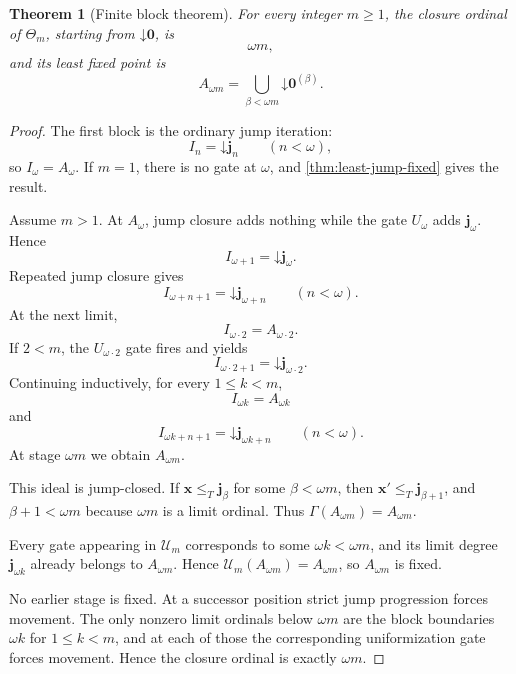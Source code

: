 \documentclass[10pt,a4paper]{amsart}
\newtheorem{theorem}{Theorem}
\newcommand{\down}{\mathord{\downarrow}}
\newcommand{\leT}{\leq_T}
\begin{document}
\begin{theorem}[Finite block theorem]
\label{thm:finite-block}
For every integer $m\geq1$, the closure ordinal of $\Theta_m$, starting from $\down\mathbf0$, is
\[
\omega m,
\]
and its least fixed point is
\begin{equation}
A_{\omega m}
=
\bigcup_{\beta<\omega m}\down\mathbf0^{(\beta)}.
\label{eq:A-omegam}
\end{equation}
\end{theorem}

\begin{proof}
The first block is the ordinary jump iteration:
\[
I_n=\down\mathbf j_n
\qquad(n<\omega),
\]
so $I_\omega=A_\omega$. If $m=1$, there is no gate at $\omega$, and \cref{thm:least-jump-fixed} gives the result.

Assume $m>1$. At $A_\omega$, jump closure adds nothing while the gate $U_\omega$ adds $\mathbf j_\omega$. Hence
\[
I_{\omega+1}=\down\mathbf j_\omega.
\]
Repeated jump closure gives
\[
I_{\omega+n+1}=\down\mathbf j_{\omega+n}
\qquad(n<\omega).
\]
At the next limit,
\[
I_{\omega\cdot2}=A_{\omega\cdot2}.
\]
If $2<m$, the $U_{\omega\cdot2}$ gate fires and yields
\[
I_{\omega\cdot2+1}=\down\mathbf j_{\omega\cdot2}.
\]
Continuing inductively, for every $1\leq k<m$,
\begin{equation}
I_{\omega k}=A_{\omega k}
\label{eq:block-boundary}
\end{equation}
and
\begin{equation}
I_{\omega k+n+1}=\down\mathbf j_{\omega k+n}
\qquad(n<\omega).
\label{eq:inside-block}
\end{equation}
At stage $\omega m$ we obtain $A_{\omega m}$.

This ideal is jump-closed. If $\mathbf x\leT\mathbf j_\beta$ for some $\beta<\omega m$, then
$\mathbf x'\leT\mathbf j_{\beta+1}$, and $\beta+1<\omega m$ because $\omega m$ is a limit ordinal. Thus $\Gamma(A_{\omega m})=A_{\omega m}$.

Every gate appearing in $\mathcal U_m$ corresponds to some $\omega k<\omega m$, and its limit degree $\mathbf j_{\omega k}$ already belongs to $A_{\omega m}$. Hence $\mathcal U_m(A_{\omega m})=A_{\omega m}$, so $A_{\omega m}$ is fixed.

No earlier stage is fixed. At a successor position strict jump progression forces movement. The only nonzero limit ordinals below $\omega m$ are the block boundaries $\omega k$ for $1\leq k<m$, and at each of those the corresponding uniformization gate forces movement. Hence the closure ordinal is exactly $\omega m$.
\end{proof}
\end{document}
